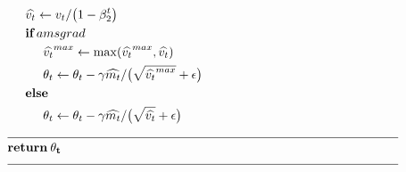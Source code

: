 \documentclass[]{article}
\begin{document}
\begin{align}
        &\hspace{5mm}\widehat{v_t} \leftarrow   v_t/\big(1-\beta_2^t \big)                   \\
        &\hspace{5mm}\textbf{if} \: amsgrad                                                  \\
        &\hspace{10mm}\widehat{v_t}^{max} \leftarrow \mathrm{max}(\widehat{v_t}^{max},
            \widehat{v_t})                                                                   \\
        &\hspace{10mm}\theta_t \leftarrow \theta_t - \gamma \widehat{m_t}/
            \big(\sqrt{\widehat{v_t}^{max}} + \epsilon \big)                                 \\
        &\hspace{5mm}\textbf{else}                                                           \\
        &\hspace{10mm}\theta_t \leftarrow \theta_t - \gamma \widehat{m_t}/
            \big(\sqrt{\widehat{v_t}} + \epsilon \big)                                       \\
        &\rule{110mm}{0.4pt}                                                          \\[-1.ex]
        &\bf{return} \:  \theta_t                                                     \\[-1.ex]
        &\rule{110mm}{0.4pt}                                                          \\[-1.ex]
    \end{align}
\end{document}

